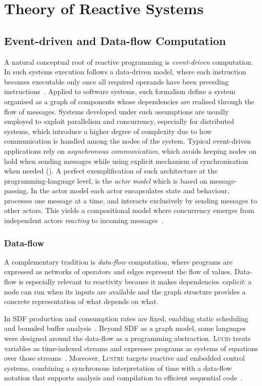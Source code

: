 \section{Theory of Reactive Systems}

\subsection{Event-driven and Data-flow Computation}

A natural conceptual root of reactive programming is \emph{event-driven}
computation. In such systems execution follows a data-driven model, where each
instruction becomes executable only once all required operands have been
preceding instructions~\cite{dennis1974PABDFP}. Applied to software systems,
such formalism define a system organised as a graph of components whose
dependencies are realised through the flow of messages. Systems developed under
such assumptions are usually employed to exploit parallelism and concurrency,
especially for distributed systems, which introduce a higher degree of
complexity due to how communication is handled among the nodes of the system.
Typical event-driven applications rely on \emph{asynchronous communication},
which avoids keeping nodes on hold when sending messages while using explicit
mechanism of synchronisation when needed (). A perfect
exemplification of such architecture at the programming-language level, is the
\emph{actor model} which is based on message-passing. In the actor model each
actor encapsulates state and behaviour, processes one message at a time, and
interacts exclusively by sending messages to other actors. This yields a
compositional model where concurrency emerges from independent actors
\emph{reacting} to incoming messages~\cite{agha1986AMCCDS}.

\subsubsection{Data-flow} A complementary tradition is \emph{data-flow}
computation, where programs are expressed as networks of operators and edges
represent the flow of values. Data-flow is especially relevant to reactivity
because it makes dependencies \emph{explicit}: a node can run when its inputs
are available and the graph structure provides a concrete representation of
what depends on what.

In \ac{SDF} production and consumption rates are fixed, enabling static
scheduling and bounded buffer analysis~\cite{lee1987SDF}. Beyond \ac{SDF} as a
graph model, some languages were designed around the data-flow as a programming
abstraction. \textsc{Lucid} treats variables as time-indexed streams and
expresses programs as systems of equations over those
streams~\cite{wadge1985LUCID}. Moreover, \textsc{Lustre} targets reactive and
embedded control systems, combining a synchronous interpretation of time with a
data-flow notation that supports analysis and compilation to efficient
sequential code~\cite{halbwachs1991LUSTRE}.

